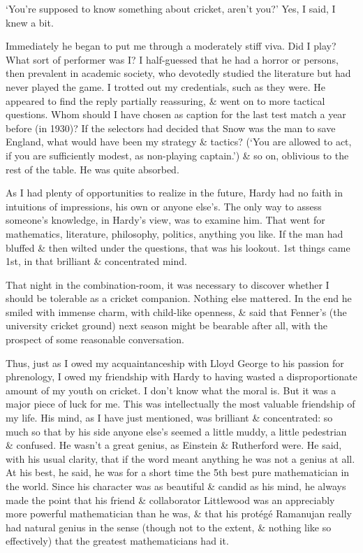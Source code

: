 \documentclass{article}
\numberwithin{equation}{section}
\begin{document}
`You're supposed to know something about cricket, aren't you?' Yes, I said, I knew a bit.

Immediately he began to put me through a moderately stiff viva. Did I play? What sort of performer was I? I half-guessed that he had a horror or persons, then prevalent in academic society, who devotedly studied the literature but had never played the game. I trotted out my credentials, such as they were. He appeared to find the reply partially reassuring, \& went on to more tactical questions. Whom should I have chosen as caption for the last test match a year before (in 1930)? If the selectors had decided that Snow was the man to save England, what would have been my strategy \& tactics? (`You are allowed to act, if you are sufficiently modest, as non-playing captain.') \& so on, oblivious to the rest of the table. He was quite absorbed.

As I had plenty of opportunities to realize in the future, Hardy had no faith in intuitions of impressions, his own or anyone else's. The only way to assess someone's knowledge, in Hardy's view, was to examine him. That went for mathematics, literature, philosophy, politics, anything you like. If the man had bluffed \& then wilted under the questions, that was his lookout. 1st things came 1st, in that brilliant \& concentrated mind.

That night in the combination-room, it was necessary to discover whether I should be tolerable as a cricket companion. Nothing else mattered. In the end he smiled with immense charm, with child-like openness, \& said that Fenner's (the university cricket ground) next season might be bearable after all, with the prospect of some reasonable conversation.

Thus, just as I owed my acquaintanceship with Lloyd George to his passion for phrenology, I owed my friendship with Hardy to having wasted a disproportionate amount of my youth on cricket. I don't know what the moral is. But it was a major piece of luck for me. This was intellectually the most valuable friendship of my life. His mind, as I have just mentioned, was brilliant \& concentrated: so much so that by his side anyone else's seemed a little muddy, a little pedestrian \& confused. He wasn't a great genius, as Einstein \& Rutherford were. He said, with his usual clarity, that if the word meant anything he was not a genius at all. At his best, he said, he was for a short time the 5th best pure mathematician in the world. Since his character was as beautiful \& candid as his mind, he always made the point that his friend \& collaborator Littlewood was an appreciably more powerful mathematician than he was, \& that his prot\'eg\'e Ramanujan really had natural genius in the sense (though not to the extent, \& nothing like so effectively) that the greatest mathematicians had it.
\end{document}
